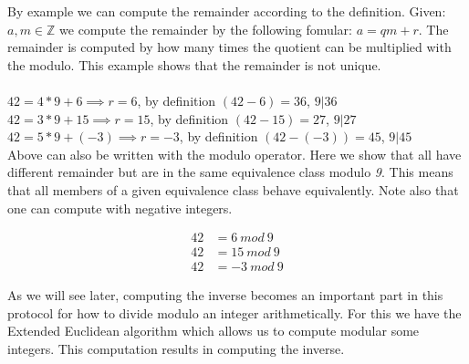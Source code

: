  By example we can compute the remainder according to the definition. Given: \begin{math} a, m \in \mathbb{Z} \end{math} we compute the remainder by the following fomular:  \begin{math} a = qm +r \end{math}. The remainder is computed by how many times the quotient can be multiplied with the modulo. This example shows that the remainder is not unique. \\\\
\begin{math}42 = 4 * 9 +6 \implies r = 6 \end{math}, by definition \begin{math} (42-6) = 36 \end{math}, \begin{math} 9| 36 \end{math}\\
\begin{math}42 = 3 * 9 +15 \implies r = 15 \end{math}, by definition \begin{math} (42-15) = 27 \end{math}, \begin{math} 9| 27 \end{math}\\
\begin{math}42 = 5 * 9 +(-3) \implies r = -3 \end{math}, by definition \begin{math} (42-(-3)) = 45 \end{math}, \begin{math} 9| 45 \end{math}\\

 Above can also be written with the modulo operator. Here we show that all have different remainder but are in the same equivalence class modulo \textit{9}. This means that all members of a given equivalence class behave equivalently. Note also that one can compute with negative integers.

\begin{align*}
42 &= 6 \ mod \ 9 \\
42 &= 15 \ mod \ 9 \\
42 &= -3 \ mod \ 9 
\end{align*}

As we will see later, computing the inverse becomes an important part in this protocol for how to divide modulo an integer arithmetically. For this we have the Extended Euclidean algorithm which allows us to compute modular some integers. This computation results in computing the inverse. \\


